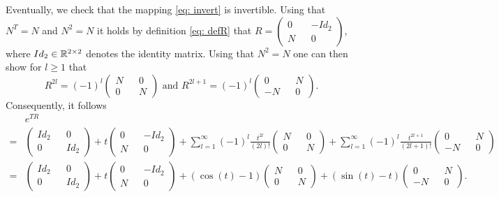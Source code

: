 \documentclass[11pt]{article}
\begin{document}
\begin{remark}
\begin{enumerate}
Eventually, we check that the mapping \eqref{eq: invert} is invertible.
Using that $N^T = N$ and $N^2=N$ it holds by definition \eqref{eq: defR} that  $R = \begin{pmatrix}
    0 && - Id_2 \\ N && 0
\end{pmatrix}$, where $Id_2 \in \mathbb R^{2\times 2}$ denotes the identity matrix.
Using that $N^2 = N$ one can then show for $l\geq 1$ that
\[
R^{2l} = (-1)^l \begin{pmatrix}
    N && 0 \\ 0 && N
\end{pmatrix} \text{ and } R^{2l+1} = (-1)^l \begin{pmatrix}
    0 && N \\ -N && 0
\end{pmatrix}.
\]
Consequently, it follows 
\begin{align*}
&e^{TR} \\ = &\begin{pmatrix}
    Id_2 && 0  \\ 0 && Id_2
\end{pmatrix} + t \begin{pmatrix}
    0 && - Id_2 \\ N && 0
\end{pmatrix} + \sum_{l=1}^{\infty} (-1)^l \frac{t^{2l}}{(2l)!} \begin{pmatrix}
    N && 0 \\ 0 && N
\end{pmatrix} + \sum_{l=1}^{\infty} (-1)^l \frac{t^{2l+1}}{(2l+1)!} \begin{pmatrix}
    0 && N \\ -N && 0
\end{pmatrix} \\
= &\begin{pmatrix}
    Id_2 && 0  \\ 0 && Id_2
\end{pmatrix} + t \begin{pmatrix}
    0 && - Id_2 \\ N && 0
\end{pmatrix} + (\cos(t)-1) \begin{pmatrix}
    N && 0 \\ 0 && N
\end{pmatrix}+  (\sin(t) - t) \begin{pmatrix}
    0 && N \\ -N && 0
\end{pmatrix}.
\end{align*}

\end{enumerate}
\end{remark}
\end{document}
